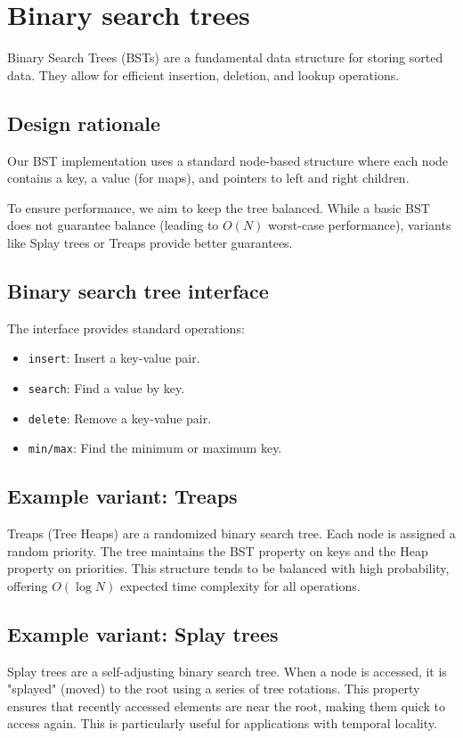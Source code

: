 \chapter{Binary search trees}\label{chap:binary:search:trees}

Binary Search Trees (BSTs) are a fundamental data structure for storing sorted data. They allow for efficient insertion, deletion, and lookup operations.

\section{Design rationale}

Our BST implementation uses a standard node-based structure where each node contains a key, a value (for maps), and pointers to left and right children.

To ensure performance, we aim to keep the tree balanced. While a basic BST does not guarantee balance (leading to $O(N)$ worst-case performance), variants like Splay trees or Treaps provide better guarantees.

\section{Binary search tree interface}

The interface provides standard operations:
\begin{itemize}
    \item \texttt{insert}: Insert a key-value pair.
    \item \texttt{search}: Find a value by key.
    \item \texttt{delete}: Remove a key-value pair.
    \item \texttt{min/max}: Find the minimum or maximum key.
\end{itemize}

\section{Example variant: Treaps}

Treaps (Tree Heaps) are a randomized binary search tree. Each node is assigned a random priority. The tree maintains the BST property on keys and the Heap property on priorities. This structure tends to be balanced with high probability, offering $O(\log N)$ expected time complexity for all operations.

\section{Example variant: Splay trees}

Splay trees are a self-adjusting binary search tree. When a node is accessed, it is "splayed" (moved) to the root using a series of tree rotations. This property ensures that recently accessed elements are near the root, making them quick to access again. This is particularly useful for applications with temporal locality.
